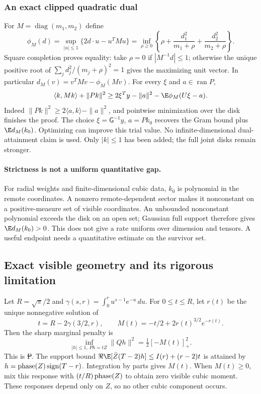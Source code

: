 \subsubsection{An exact clipped quadratic dual}
For $M=\operatorname{diag}(m_1,m_2)$ define
\[
 \phi_M(d)=\sup_{|u|\le1}\{2d\cdot u-u^TMu\}
 =\inf_{\rho\ge0}\left\{\rho+
       \frac{d_1^2}{m_1+\rho}+\frac{d_2^2}{m_2+\rho}\right\}.
\]
Square completion proves equality: take $\rho=0$ if $|M^{-1}d|\le1$;
otherwise the unique positive root of
$\sum_jd_j^2/(m_j+\rho)^2=1$ gives the maximizing unit vector.
In particular $d_M(v)=v^TMv-\phi_M(Mv)$.
For every $\xi$ and $a\in\operatorname{ran}P$,
\begin{equation}\label{eq:clipped-response-dual}
 \langle k,Mk\rangle+\|Pk\|^2
 \ge2\xi^Ty-\|a\|^2-\E\phi_M(U\xi-a).
\end{equation}
Indeed $\|Pk\|^2\ge2\langle a,k\rangle-\|a\|^2$, and pointwise
minimization over the disk finishes the proof. The choice
$\xi=\mathsf G^{-1}y$, $a=Pk_0$ recovers the Gram bound plus
$\E d_M(k_0)$. Optimizing can improve this trial value.
No infinite-dimensional dual-attainment claim is used.
Only $|k|\le1$ has been added; the full joint disks remain stronger.

\paragraph{Strictness is not a uniform quantitative gap.}
For radial weights and finite-dimensional cubic data, $k_0$ is polynomial
in the remote coordinates. A nonzero remote-dependent sector makes it
nonconstant on a positive-measure set of visible coordinates.
An unbounded nonconstant polynomial exceeds the disk on an open set;
Gaussian full support therefore gives $\E d_M(k_0)>0$.
This does not give a rate uniform over dimension and tensors.
A useful endpoint needs a quantitative estimate on the survivor set.

\subsection{Exact visible geometry and its rigorous limitation}
\label{sec:exact-visible-response-geometry}
Let $R=\sqrt\pi/2$ and $\gamma(s,r)=\int_0^r u^{s-1}e^{-u}\,du$.
For $0\le t\le R$, let $r(t)$ be the unique nonnegative solution of
\[
 t=R-2\gamma(3/2,r),\qquad
 M(t)=-t/2+2r(t)^{3/2}e^{-r(t)}.
\]
Then the sharp marginal penalty is
\begin{equation}\label{eq:exact-visible-penalty}
 \inf_{|h|\le1,\,Ph=tZ}\|Qh\|^2=\tfrac12[-M(t)]_+^2.
\end{equation}
This is \st{P}. The support bound
$\Re\E[\bar Z(T-2)h]\le I(r)+(r-2)t$
is attained by $h=\operatorname{phase}(Z)\operatorname{sign}(T-r)$.
Integration by parts gives $M(t)$. When $M(t)\ge0$, mix this
response with $(t/R)\operatorname{phase}(Z)$ to obtain zero visible cubic moment.
These responses depend only on $Z$, so no other cubic component occurs.

